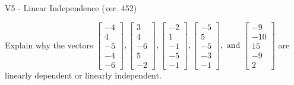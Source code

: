 \begin{exercise}
  \begin{exerciseTitle}V5 - Linear Independence (ver. 452)\end{exerciseTitle}
  \begin{exerciseStatement}
    Explain why the vectors \(\left[\begin{array}{r}
-4 \\
4 \\
-5 \\
-4 \\
-6
\end{array}\right] , \left[\begin{array}{r}
3 \\
4 \\
-6 \\
5 \\
-2
\end{array}\right] , \left[\begin{array}{r}
-2 \\
1 \\
-1 \\
-5 \\
-1
\end{array}\right] , \left[\begin{array}{r}
-5 \\
5 \\
-5 \\
-3 \\
-1
\end{array}\right] , \text{ and } \left[\begin{array}{r}
-9 \\
-10 \\
15 \\
-9 \\
2
\end{array}\right]\) are linearly dependent or linearly independent.	



\end{exerciseStatement}
\end{exercise}
